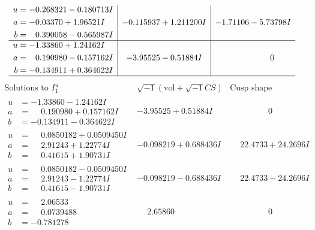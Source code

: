 \documentclass[1p]{elsarticle_modified}
\theoremstyle{definition}
\newcommand{\I}{\sqrt{-1}}
\begin{document}
$$\begin{array}{c|c|c}
\begin{aligned}
u &= -0.268321 - 0.180713 I \\
a &= -0.03370 + 1.96521 I \\
b &= \phantom{-}0.390058 - 0.565987 I\end{aligned}
 & -0.115937 + 1.211200 I & -1.71106 - 5.73798 I \\ \hline\begin{aligned}
u &= -1.33860 + 1.24162 I \\
a &= \phantom{-}0.190980 - 0.157162 I \\
b &= -0.134911 + 0.364622 I\end{aligned}
 & -3.95525 - 0.51884 I & \phantom{-0.000000 } 0\\
 \hline 
 \end{array}$$\newpage$$\begin{array}{c|c|c}  
\text{Solutions to }I^u_{1}& \I (\text{vol} + \sqrt{-1}CS) & \text{Cusp shape}\\
 \hline 
\begin{aligned}
u &= -1.33860 - 1.24162 I \\
a &= \phantom{-}0.190980 + 0.157162 I \\
b &= -0.134911 - 0.364622 I\end{aligned}
 & -3.95525 + 0.51884 I & \phantom{-0.000000 } 0 \\ \hline\begin{aligned}
u &= \phantom{-}0.0850182 + 0.0509450 I \\
a &= \phantom{-}2.91243 + 1.22774 I \\
b &= \phantom{-}0.41615 + 1.90731 I\end{aligned}
 & -0.098219 + 0.688436 I & \phantom{-}22.4733 + 24.2696 I \\ \hline\begin{aligned}
u &= \phantom{-}0.0850182 - 0.0509450 I \\
a &= \phantom{-}2.91243 - 1.22774 I \\
b &= \phantom{-}0.41615 - 1.90731 I\end{aligned}
 & -0.098219 - 0.688436 I & \phantom{-}22.4733 - 24.2696 I \\ \hline\begin{aligned}
u &= \phantom{-}2.06533\phantom{ +0.000000I} \\
a &= \phantom{-}0.0739488\phantom{ +0.000000I} \\
b &= -0.781278\phantom{ +0.000000I}\end{aligned}
 & \phantom{-}2.65860\phantom{ +0.000000I} & \phantom{-0.000000 } 0 \\ \hline\begin{aligned}

\end{aligned}
\end{array}$$
\end{document}
